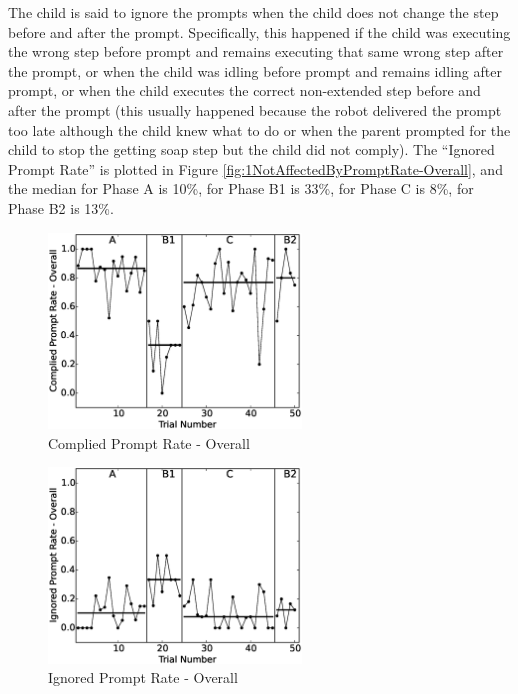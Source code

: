 The child is said to ignore the prompts when the child does not change the step before and after the prompt.  Specifically, this happened if the child was executing the wrong step before prompt and remains executing that same wrong step after the prompt, or when the child was idling before prompt and remains idling after prompt, or when the child executes the correct non-extended step before and after the prompt (this usually happened because the robot delivered the prompt too late although the child knew what to do or when the parent prompted for the child to stop the getting soap step but the child did not comply).  The ``Ignored Prompt Rate'' is plotted in Figure \ref{fig:1NotAffectedByPromptRate-Overall}, and the median for Phase A is 10\%, for Phase B1 is 33\%, for Phase C is 8\%, for Phase B2 is 13\%.
\begin{figure} [h]
	\centering
	\includegraphics[width=0.6\textwidth]{./img/data_analysis/4CompliedPromptRate-Overall.eps}
	\caption{Complied Prompt Rate - Overall}
	\label{fig:4CompliedPromptRate-Overall}
\end{figure}
\begin{figure} [h]
	\centering
	\includegraphics[width=0.6\textwidth]{./img/data_analysis/1IgnoredPromptRate-Overall.eps}
	\caption{Ignored Prompt Rate - Overall}
	\label{fig:1IgnoredPromptRate-Overall}
\end{figure}


